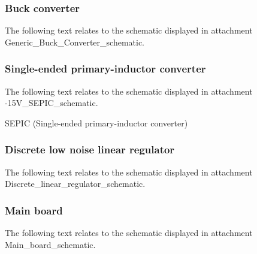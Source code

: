 \subsubsection*{Buck converter}
The following text relates to the schematic displayed in attachment Generic\_Buck\_Converter\_schematic.

\subsubsection*{Single-ended primary-inductor converter}
The following text relates to the schematic displayed in attachment -15V\_SEPIC\_schematic.

SEPIC (Single-ended primary-inductor converter)

\subsubsection*{Discrete low noise linear regulator}
The following text relates to the schematic displayed in attachment Discrete\_linear\_regulator\_schematic.

\subsubsection*{Main board}
The following text relates to the schematic displayed in attachment Main\_board\_schematic.
